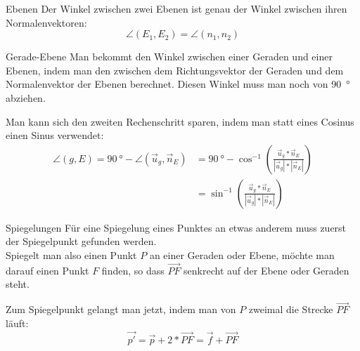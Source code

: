 \begin{bla}{Ebenen}
	Der Winkel zwischen zwei Ebenen ist genau der Winkel zwischen ihren Normalenvektoren:
	\[
	\angle(E_1,E_2) = \angle(n_1,n_2)
	\]
\end{bla}

\begin{bla}{Gerade-Ebene}
	Man bekommt den Winkel zwischen einer Geraden und einer Ebenen, indem man den zwischen dem Richtungsvektor der Geraden und dem Normalenvektor der Ebenen berechnet.
	Diesen Winkel muss man noch von \SI{90}{\degree} abziehen.

	Man kann sich den zweiten Rechenschritt sparen, indem man statt eines Cosinus einen Sinus verwendet:
	\begin{align*}
	\angle(g,E) = \SI{90}{\degree} - \angle(\vec u_g, \vec n_E)
	&= \SI{90}{\degree} - \cos^{-1} \left( \frac {\vec u_g * \vec n_E }{ |\vec u_g| * |\vec n_E| } \right)
	\\
	&= \sin^{-1} \left( \frac {\vec u_g * \vec n_E }{ |\vec u_g| * |\vec n_E| } \right)
	\end{align*}
\end{bla}

\begin{bla}
	{Spiegelungen}
	Für eine Spiegelung eines Punktes an etwas anderem muss zuerst der Spiegelpunkt gefunden werden.
	\\
	Spiegelt man also einen Punkt $P$ an einer Geraden oder Ebene, möchte man darauf einen Punkt $F$ finden, so dass $\overrightarrow{PF}$ senkrecht auf der Ebene oder Geraden steht.

	Zum Spiegelpunkt gelangt man jetzt, indem man von $P$ zweimal die Strecke $\overrightarrow{PF}$ läuft:
	\[
	\vec{p'} = \vec{p} + 2* \overrightarrow{PF} = \vec{f} + \overrightarrow{PF}
	\]
\end{bla}

